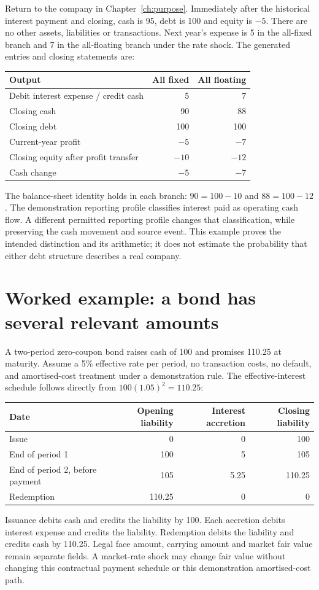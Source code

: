 Return to the company in Chapter~\ref{ch:purpose}. Immediately after the
historical interest payment and closing, cash is 95, debt is 100 and equity
is $-5$. There are no other assets, liabilities or transactions. Next year's
expense is 5 in the all-fixed branch and 7 in the all-floating branch under
the rate shock. The generated entries and closing statements are:

\begin{center}
\begin{tabular}{lrr}
\toprule Output & All fixed & All floating\\\midrule
Debit interest expense / credit cash &5&7\\
Closing cash &90&88\\
Closing debt &100&100\\
Current-year profit & $-5$ & $-7$\\
Closing equity after profit transfer &$-10$&$-12$\\
Cash change &$-5$&$-7$\\\bottomrule
\end{tabular}
\end{center}
The balance-sheet identity holds in each branch: $90=100-10$ and
$88=100-12$. The demonstration reporting profile classifies interest paid as
operating cash flow. A different permitted reporting profile changes that
classification, while preserving the cash movement and source event. This
example proves the intended distinction and its arithmetic; it does not
estimate the probability that either debt structure describes a real company.

\section{Worked example: a bond has several relevant amounts}

A two-period zero-coupon bond raises cash of 100 and promises 110.25 at maturity.
Assume a 5\% effective rate per period, no transaction costs, no default, and
amortised-cost treatment under a demonstration rule. The effective-interest
schedule follows directly from $100(1.05)^2=110.25$:
\begin{center}
\begin{tabular}{lrrr}
\toprule Date & Opening liability & Interest accretion & Closing liability\\\midrule
Issue &0&0&100\\
End of period 1 &100&5&105\\
End of period 2, before payment &105&5.25&110.25\\
Redemption &110.25&0&0\\\bottomrule
\end{tabular}
\end{center}
Issuance debits cash and credits the liability by 100. Each accretion debits
interest expense and credits the liability. Redemption debits the liability
and credits cash by 110.25. Legal face amount, carrying amount and market
fair value remain separate fields. A market-rate shock may change fair value
without changing this contractual payment schedule or this demonstration
amortised-cost path.

